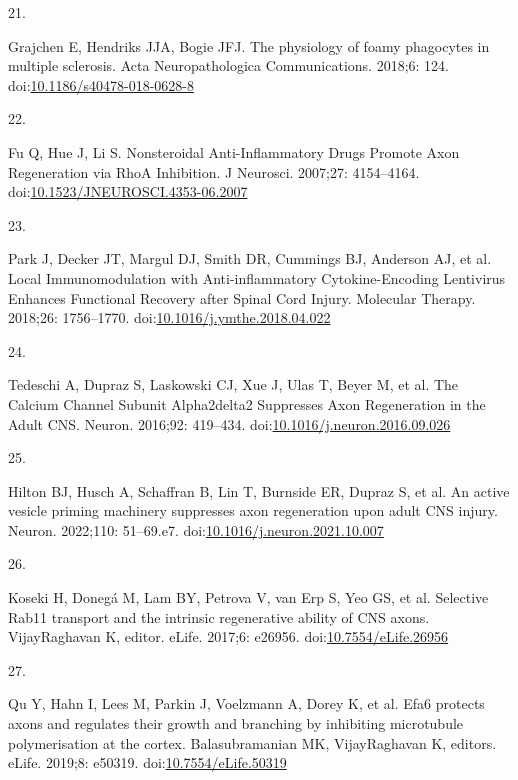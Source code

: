 \documentclass[
  12pt,
  a4paper,
]{book}
\newlength{\cslhangindent}
\newlength{\csllabelwidth}
\newenvironment{CSLReferences}[2] %
 {\begin{list}{}{%
  \setlength{\itemindent}{0pt}
  \setlength{\leftmargin}{0pt}
  \setlength{\parsep}{0pt}
  \ifodd #1
   \setlength{\leftmargin}{\cslhangindent}
   \setlength{\itemindent}{-1\cslhangindent}
  \fi
  \setlength{\itemsep}{#2\baselineskip}}}
 {\end{list}}
\newcommand{\CSLLeftMargin}[1]{\parbox[t]{\csllabelwidth}{\strut#1\strut}}
\newcommand{\CSLRightInline}[1]{\parbox[t]{\linewidth - \csllabelwidth}{\strut#1\strut}}
\begin{document}
\begin{CSLReferences}{0}{1}
\CSLLeftMargin{21. }%
\CSLRightInline{Grajchen E, Hendriks JJA, Bogie JFJ. The physiology of foamy phagocytes in multiple sclerosis. Acta Neuropathologica Communications. 2018;6: 124. doi:\href{https://doi.org/10.1186/s40478-018-0628-8}{10.1186/s40478-018-0628-8}}

\CSLLeftMargin{22. }%
\CSLRightInline{Fu Q, Hue J, Li S. Nonsteroidal {Anti-Inflammatory Drugs Promote Axon Regeneration} via {RhoA Inhibition}. J Neurosci. 2007;27: 4154--4164. doi:\href{https://doi.org/10.1523/JNEUROSCI.4353-06.2007}{10.1523/JNEUROSCI.4353-06.2007}}

\CSLLeftMargin{23. }%
\CSLRightInline{Park J, Decker JT, Margul DJ, Smith DR, Cummings BJ, Anderson AJ, et al. Local {Immunomodulation} with {Anti-inflammatory Cytokine-Encoding Lentivirus Enhances Functional Recovery} after {Spinal Cord Injury}. Molecular Therapy. 2018;26: 1756--1770. doi:\href{https://doi.org/10.1016/j.ymthe.2018.04.022}{10.1016/j.ymthe.2018.04.022}}

\CSLLeftMargin{24. }%
\CSLRightInline{Tedeschi A, Dupraz S, Laskowski CJ, Xue J, Ulas T, Beyer M, et al. The {Calcium Channel Subunit Alpha2delta2 Suppresses Axon Regeneration} in the {Adult CNS}. Neuron. 2016;92: 419--434. doi:\href{https://doi.org/10.1016/j.neuron.2016.09.026}{10.1016/j.neuron.2016.09.026}}

\CSLLeftMargin{25. }%
\CSLRightInline{Hilton BJ, Husch A, Schaffran B, Lin T, Burnside ER, Dupraz S, et al. An active vesicle priming machinery suppresses axon regeneration upon adult {CNS} injury. Neuron. 2022;110: 51--69.e7. doi:\href{https://doi.org/10.1016/j.neuron.2021.10.007}{10.1016/j.neuron.2021.10.007}}

\CSLLeftMargin{26. }%
\CSLRightInline{Koseki H, Donegá M, Lam BY, Petrova V, van Erp S, Yeo GS, et al. Selective Rab11 transport and the intrinsic regenerative ability of {CNS} axons. VijayRaghavan K, editor. eLife. 2017;6: e26956. doi:\href{https://doi.org/10.7554/eLife.26956}{10.7554/eLife.26956}}

\CSLLeftMargin{27. }%
\CSLRightInline{Qu Y, Hahn I, Lees M, Parkin J, Voelzmann A, Dorey K, et al. Efa6 protects axons and regulates their growth and branching by inhibiting microtubule polymerisation at the cortex. Balasubramanian MK, VijayRaghavan K, editors. eLife. 2019;8: e50319. doi:\href{https://doi.org/10.7554/eLife.50319}{10.7554/eLife.50319}}


\end{CSLReferences}
\end{document}
